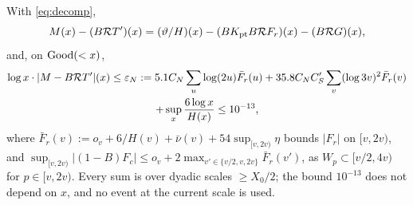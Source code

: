 \begin{lemma}\label{lem:predictable}
With \eqref{eq:decomp},
\begin{equation}\label{eq:predictable}
  M(x)-(B\mathcal{R} T')(x)=(\vartheta/H)(x)-(BK_{\mathrm{pt}} B\mathcal{R} F_r)(x)-(B\mathcal{R} G)(x),
\end{equation}
and, on $\mathrm{Good}(<x)$,
\begin{multline*}
  \log x\cdot|M-B\mathcal{R} T'|(x)\le\varepsilon_N:=5.1C_N\sum_u\log(2u)\bar F_r(u)+35.8C_NC_S'\sum_v(\log3v)^2\bar F_r(v)\\
  +\sup_x\frac{6\log x}{H(x)}\le10^{-13},
\end{multline*}
where $\bar F_r(v):=o_v+6/H(v)+\bar\nu(v)+54\sup_{[v,2v)}\eta$ bounds $|F_r|$ on $[v,2v)$, and
$\sup_{[v,2v)}|(1-B)F_c|\le o_v+2\max_{v'\in\{v/2,v,2v\}}\bar F_r(v')$, as $W_p\subset[v/2,4v)$ for $p\in[v,2v)$.
Every sum is over dyadic scales $\ge X_0/2$; the bound $10^{-13}$ does not depend on $x$, and no event at the current scale is used.
\end{lemma}

